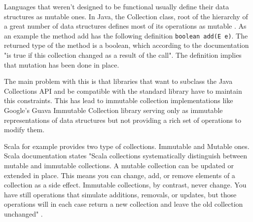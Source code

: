 \documentclass[../main.tex]{subfiles}
\begin{document}
Languages that weren't designed to be functional usually define their data structures as mutable ones. In Java, the Collection class, root of the hierarchy of a great number of data structures defines most of its operations as mutable \autocite{Collection}. As an example the method add has the following definition \texttt{boolean add(E e)}. The returned type of the method is a boolean, which according to the documentation "is true if this collection changed as a result of the call". The definition implies that mutation has been done in place.

The main problem with this is that libraries that want to subclass the Java Collections API and be compatible with the standard library have to maintain this constraints. This has lead to immutable collection implementations like Google's Guava Immutable Collection library \autocite{ImmutableCollectionAPI} serving only as immutable representations of data structures but not providing a rich set of operations to modify them.

Scala for example provides two type of collections. Immutable and Mutable ones. Scala documentation states "Scala collections systematically distinguish between mutable and immutable collections. A mutable collection can be updated or extended in place. This means you can change, add, or remove elements of a collection as a side effect. Immutable collections, by contrast, never change. You have still operations that simulate additions, removals, or updates, but those operations will in each case return a new collection and leave the old collection unchanged" \autocite{MutableDocumentation}.
\end{document}
